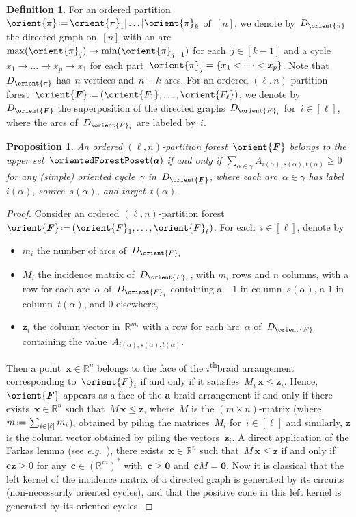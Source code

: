 \documentclass{amsart}
\newtheorem{proposition}[theorem]{Proposition}
\theoremstyle{definition}
\newtheorem{definition}[theorem]{Definition}
\newcommand{\R}{\mathbb{R}} %
\renewcommand{\b}[1]{{\boldsymbol{#1}}} %
\newcommand{\eqdef}{\mbox{\,\raisebox{0.2ex}{\scriptsize\ensuremath{\mathrm:}}\ensuremath{=}\,}} %
\newcommand{\eg}{\textit{e.g.}~} %
\newcommand{\ordinal}{\textsuperscript{th}} %
\renewcommand{\b}[1]{\boldsymbol{#1}} %
\begin{document}
\begin{definition}
For an ordered partition~$\orient{\pi} \eqdef \orient{\pi}_1 | \dots | \orient{\pi}_k$ of~$[n]$, we denote by~$D_{\orient{\pi}}$ the directed graph on~$[n]$ with an arc~$\max(\orient{\pi}_j) \to \min(\orient{\pi}_{j+1})$ for each~$j \in [k-1]$ and a cycle~${x_1 \to \dots \to x_p \to x_1}$ for each part~$\orient{\pi}_j = \{x_1 < \dots < x_p\}$.
Note that~$D_{\orient{\pi}}$ has~$n$ vertices and~$n + k$ arcs.
For an ordered $(\ell,n)$-partition forest~$\orient{\b{F}} \eqdef (\orient{F_1}, \dots, \orient{F_\ell})$, we denote by~$D_{\orient{\b{F}}}$ the superposition of the directed graphs~$D_{\orient{F}_i}$ for~$i \in [\ell]$, where the arcs of~$D_{\orient{F}_i}$ are labeled by~$i$.
\end{definition}

\begin{proposition}
An ordered $(\ell,n)$-partition forest~$\orient{\b{F}}$ belongs to the upper set~$\orientedForestPoset(\b{a})$ if and only if $\sum_{\alpha \in \gamma} A_{i(\alpha), s(\alpha), t(\alpha)} \ge 0$ for any (simple) oriented cycle~$\gamma$ in~$D_{\orient{\b{F}}}$, where each arc~$\alpha \in \gamma$ has label~$i(\alpha)$, source~$s(\alpha)$, and target~$t(\alpha)$.
\end{proposition}

\begin{proof}
Consider an ordered $(\ell,n)$-partition forest~$\orient{\b{F}} \eqdef (\orient{F}_1, \dots, \orient{F}_\ell)$.
For each~$i \in [\ell]$, denote by
\begin{itemize}
\item $m_i$ the number of arcs of~$D_{\orient{F}_i}$
\item $M_i$ the incidence matrix of~$D_{\orient{F}_i}$, with $m_i$ rows and $n$ columns, with a row for each arc~$\alpha$ of~$D_{\orient{F}_i}$ containing a $-1$ in column~$s(\alpha)$, a $1$ in column~$t(\alpha)$, and $0$ elsewhere,
\item $\b{z}_i$ the column vector in~$\R^{m_i}$ with a row for each arc~$\alpha$ of~$D_{\orient{F}_i}$ containing the value~$A_{i(\alpha), s(\alpha), t(\alpha)}$.
\end{itemize}
Then a point~$\b{x} \in \R^n$ belongs to the face of the $i$\ordinal braid arrangement corresponding to~$\orient{F}_i$ if and only if it satisfies~$M_i \, \b{x} \le \b{z}_i$.
Hence, $\orient{\b{F}}$ appears as a face of the $\b{a}$-braid arrangement if and only if there exists~$\b{x} \in \R^n$ such that~$M \, \b{x} \le \b{z}$, where~$M$ is the $(m \times n)$-matrix (where~$m \eqdef \sum_{i \in [\ell]} m_i$), obtained by piling the matrices~$M_i$ for~$i \in [\ell]$ and similarly, $\b{z}$ is the column vector obtained by piling the vectors~$\b{z}_i$.
A direct application of the Farkas lemma (see \eg \cite[Prop.~1.7]{Ziegler-polytopes}), there exists~$\b{x} \in \R^n$ such that~$M \, \b{x} \le \b{z}$ if and only if~$\b{c} \b{z} \ge 0$ for any~$\b{c} \in (\R^m)^*$ with~$\b{c} \ge \b{0}$ and~$\b{c} M = \b{0}$.
Now it is classical that the left kernel of the incidence matrix of a directed graph is generated by its circuits (non-necessarily oriented cycles), and that the positive cone in this left kernel is generated by its oriented cycles.
\end{proof}
\end{document}

